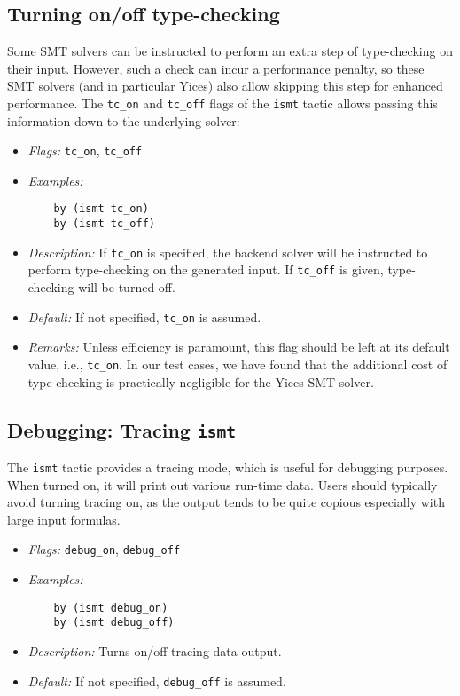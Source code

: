 \documentclass{article}
\begin{document}
\subsection{Turning on/off type-checking}
Some SMT solvers can be instructed to perform an extra step of type-checking on their input.
However, such a check can incur a performance penalty, so
these SMT solvers (and in particular Yices) also allow skipping this step for enhanced performance. The
{\tt tc\_on} and {\tt tc\_off} flags of the {\tt ismt} tactic allows passing this information down
to the underlying solver:
\begin{itemize}
\item {\em Flags:} {\tt tc\_on}, {\tt tc\_off}
\item {\em Examples:} 
\begin{verbatim}
    by (ismt tc_on)
    by (ismt tc_off)
\end{verbatim}
\item {\em Description:} If {\tt tc\_on} is specified, the backend solver will be instructed to perform
type-checking on the generated input. If {\tt tc\_off} is given, type-checking will be turned off.
\item {\em Default:} If not specified, {\tt tc\_on} is assumed.
\item {\em Remarks:} Unless efficiency is paramount, this flag should be left at its default value, i.e., {\tt tc\_on}.
In our test cases, we have found that the additional cost of type checking is practically negligible for the
Yices SMT solver.
\end{itemize}

\subsection{Debugging: Tracing {\tt ismt}}
The {\tt ismt} tactic provides a tracing mode, which is useful for debugging purposes. When
turned on, it will print out various run-time data. Users should typically 
avoid turning tracing on, as the
output tends to be quite copious especially with large input formulas.

\begin{itemize}
\item {\em Flags:} {\tt debug\_on}, {\tt debug\_off} 
\item {\em Examples:} 
\begin{verbatim}
    by (ismt debug_on)
    by (ismt debug_off)
\end{verbatim}
\item {\em Description:} Turns on/off tracing data output.
\item {\em Default:} If not specified, {\tt debug\_off} is assumed.
\end{itemize}
\end{document}
